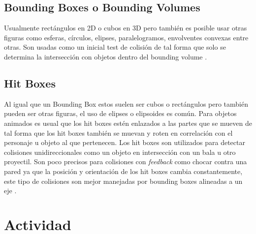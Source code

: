 \subsection{Bounding Boxes o Bounding Volumes}
Usualmente rectángulos en 2D o cubos en 3D pero también es posible usar otras figuras como esferas, círculos, elipses, paralelogramos, envolventes convexas entre otras. Son usadas como un inicial test de colisión de tal forma que solo se determina la intersección con objetos dentro del bounding volume \cite{douglas_bbox}.
\subsection{Hit Boxes}
Al igual que un Bounding Box estos suelen ser cubos o rectángulos pero también pueden ser otras figuras, el uso de elipses o elipsoides es común. Para objetos animados es usual que los hit boxes estén enlazados a las partes que se mueven de tal forma que los hit boxes también se muevan y roten en correlación con el personaje u objeto al que pertenecen. Los hit boxes son utilizados para detectar colisiones unidireccionales como un objeto en intersección con un bala u otro proyectil. Son poco precisos para colisiones con \emph{feedback} como chocar contra una pared ya que la posición y orientación de los hit boxes cambia constantemente, este tipo de colisiones son mejor manejadas por bounding boxes alineadas a un eje \cite{valve_hit}. 

\section{Actividad}
